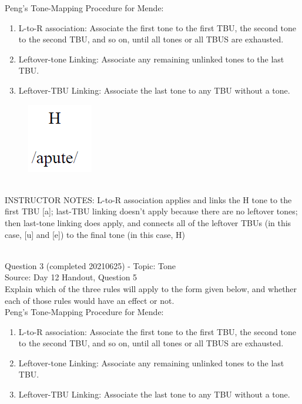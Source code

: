 \documentclass[12pt]{article}
\begin{document}
Peng’s Tone-Mapping Procedure for Mende: \begin{enumerate} \item L-to-R association: Associate the first tone to the first TBU, the second tone to the second TBU, and so on, until all tones or all TBUS are exhausted. \item Leftover-tone Linking: Associate any remaining unlinked tones to the last TBU. \item Leftover-TBU Linking: Associate the last tone to any TBU without a tone. \end{enumerate}

\begin{figure}[H]
\includegraphics{../images/mendetone_b.png}
\end{figure}

~\\
INSTRUCTOR NOTES: L-to-R association applies and links the H tone to the first TBU [a]; last-TBU linking doesn't apply because there are no leftover tones; then last-tone linking does apply, and connects all of the leftover TBUs (in this case, [u] and [e]) to the final tone (in this case, H)


~\\

{\large Question 3} (completed 20210625) - Topic: Tone\\
Source: Day 12 Handout, Question 5\\

Explain which of the three rules will apply to the form given below, and whether each of those rules would have an effect or not.\\

Peng’s Tone-Mapping Procedure for Mende: \begin{enumerate} \item L-to-R association: Associate the first tone to the first TBU, the second tone to the second TBU, and so on, until all tones or all TBUS are exhausted. \item Leftover-tone Linking: Associate any remaining unlinked tones to the last TBU. \item Leftover-TBU Linking: Associate the last tone to any TBU without a tone. \end{enumerate}
\end{document}
